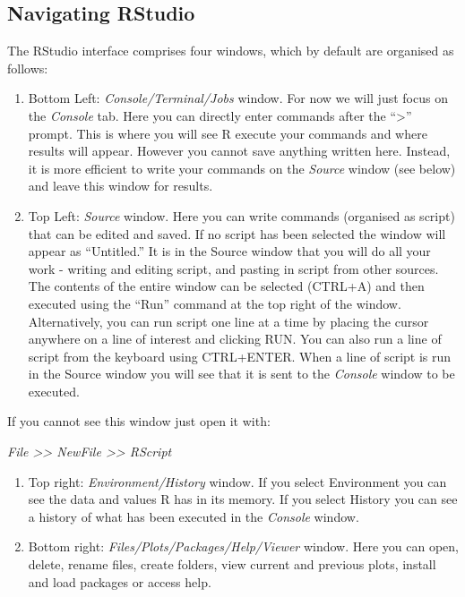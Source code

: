 \documentclass[
]{book}
\begin{document}
\hypertarget{Rstudio}{%
\subsection{Navigating RStudio}\label{Rstudio}}

The RStudio interface comprises four windows, which by default are
organised as follows:

\begin{enumerate}
\def\labelenumi{\arabic{enumi}.}
\item
  Bottom Left: \emph{Console/Terminal/Jobs} window. For now we will just
  focus on the \emph{Console} tab. Here you can directly enter commands
  after the ``\textgreater{}'' prompt. This is where you will see R
  execute your commands and where results will appear. However you
  cannot save anything written here. Instead, it is more efficient to
  write your commands on the \emph{Source} window (see below) and leave
  this window for results.
\item
  Top Left: \emph{Source} window. Here you can write commands (organised
  as script) that can be edited and saved. If no script has been
  selected the window will appear as ``Untitled.'' It is in the Source
  window that you will do all your work - writing and editing script,
  and pasting in script from other sources. The contents of the entire
  window can be selected (CTRL+A) and then executed using the ``Run''
  command at the top right of the window. Alternatively, you can run
  script one line at a time by placing the cursor anywhere on a line of
  interest and clicking RUN. You can also run a line of script from the
  keyboard using CTRL+ENTER. When a line of script is run in the Source
  window you will see that it is sent to the \emph{Console} window to be
  executed.
\end{enumerate}

If you cannot see this window just open it with:

\emph{File \textgreater\textgreater{} NewFile \textgreater\textgreater{}
RScript}

\begin{enumerate}
\def\labelenumi{\arabic{enumi}.}
\setcounter{enumi}{2}
\item
  Top right: \emph{Environment/History} window. If you select
  Environment you can see the data and values R has in its memory. If
  you select History you can see a history of what has been executed in
  the \emph{Console} window.
\item
  Bottom right: \emph{Files/Plots/Packages/Help/Viewer} window. Here you
  can open, delete, rename files, create folders, view current and
  previous plots, install and load packages or access help.
\end{enumerate}
\end{document}
